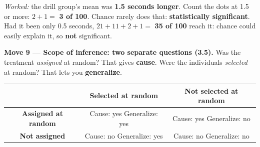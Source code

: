 \documentclass[12pt]{article}
\begin{document}
\vspace{2pt}
\noindent\begin{minipage}[c]{0.43\linewidth}\raggedright
\emph{Worked:} the drill group's mean was \textbf{1.5 seconds longer}. Count the dots at 1.5 or
more: $2+1=$ \textbf{3 of 100}. Chance rarely does that: \textbf{statistically significant}. Had
it been only 0.5 seconds, $21+11+2+1=$ \textbf{35 of 100} reach it: chance could easily explain
it, so \textbf{not} significant.
\end{minipage}\hfill
\begin{minipage}[c]{0.54\linewidth}\centering
{}
\end{minipage}

\vspace{5pt}
\boxguard[12]
\textbf{Move 9 --- Scope of inference: two separate questions (3.5).} Was the treatment
\emph{assigned} at random? That gives \textbf{cause}. Were the individuals \emph{selected} at
random? That lets you \textbf{generalize}.

\vspace{3pt}
{\centering\footnotesize
\renewcommand{\arraystretch}{1.25}
\begin{tabular}{|c|c|c|}
\hline
 & \cellcolor{sky}\textbf{Selected at random} & \cellcolor{sky}\textbf{Not selected at random} \\
\hline
\cellcolor{sky}\textbf{Assigned at random} & Cause: yes \quad Generalize: yes & Cause: yes \quad Generalize: no \\
\hline
\cellcolor{sky}\textbf{Not assigned} & Cause: no \quad Generalize: yes & Cause: no \quad Generalize: no \\
\hline
\end{tabular}\par}
\normalsize
\end{document}
